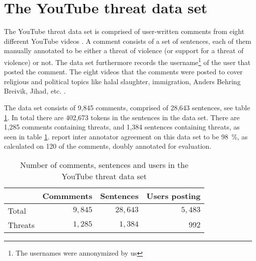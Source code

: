 \documentclass[11pt,letterpaper]{article}
\newcommand{\tov}{threat of violence}
\newcommand{\ds}{the YouTube threat data set}
\begin{document}
\section{The YouTube threat data set}
\label{sec:data}
The YouTube threat data set is comprised of user-written comments from
eight different YouTube videos \cite{hammer2014}. A comment
consists of a set of sentences, each of them manually annotated to be
either a \tov{} (or support for a \tov{}) or not. The data set
furthermore records the username\footnote{The usernames were annonymized by us}
  of the user that posted the
comment. The eight videos that the comments were posted to cover religious and political topics like halal slaughter, immigration,
Anders Behring Breivik, Jihad, etc. \cite{hammer2014}. 

The data set consists of 9,845 comments, comprised of 28,643
sentences, see table \ref{tab:dataset}. In total there are 402,673
tokens in the sentences in the data set. There are 1,285 comments
containing threats, and 1,384 sentences containing threats, as seen in
table \ref{tab:dataset}.   report inter annotator
agreement on this data set to be 98~\%, as calculated on 120 of the
comments, doubly annotated for evaluation.

\begin{table}
\begin{center}
\begin{tabular}{lrrr}
  \toprule
  
  & Commments  & Sentences  & Users posting \\
  \midrule
	
  
  Total  & $9,845$  & $28,643$  & $5,483$  \\
  Threats  & $1,285$  & $1,384$  & $992$  \\
  \bottomrule

\end{tabular}
\end{center}
\caption{Number of comments, sentences and users in \ds{}}
\label{tab:dataset}
\end{table}
\end{document}
